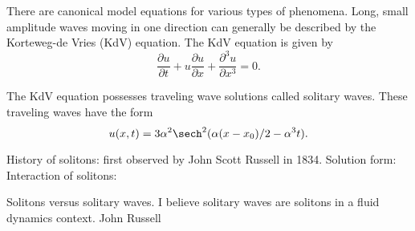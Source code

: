 \label{lab:pseudospectral2}


There are canonical model equations for various types of phenomena.  Long, small amplitude waves moving in one direction can generally be described by the  Korteweg-de Vries (KdV) equation. The KdV equation is given by 
\[  \frac{\partial u }{\partial t} + u \frac{\partial u}{\partial x} + \frac{\partial^3 u}{\partial x^3} = 0
.\]

The KdV equation possesses traveling wave solutions called solitary waves. These traveling waves have the form 
\[ u(x,t) = 3\alpha^2 \sech^2(\alpha(x-x_0)/2 - \alpha^3 t).
\]

History of solitons: first observed by John Scott Russell in 1834. 
Solution form:  
Interaction of solitons: 

Solitons versus solitary waves. I believe solitary waves are solitons in a fluid dynamics context. 
John Russell 



















